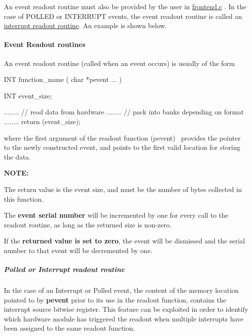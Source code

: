 An event readout routine must also be provided by the user in \hyperlink{frontend_8c}{frontend.c} . In the case of POLLED or INTERRUPT events, the event readout routine is called an \hyperlink{FE_eq_event_routines_FE_poll_or_interrupt_readout_routine}{interrupt readout routine}. An example is shown below.

\par


\par
\hypertarget{FE_eq_event_routines_FE_readout_routine}{}\paragraph{Event Readout routines}\label{FE_eq_event_routines_FE_readout_routine}
An event readout routine (called when an event occurs) is usually of the form 
\begin{DoxyCode}
INT function_name ( char *pevent ... )
{
   INT event_size;

   ........  // read data from hardware
   ........  // pack into banks depending on format
   ........
   return (event_size);
}
\end{DoxyCode}
 where the first argument of the readout function (pevent)~ provides the pointer to the newly constructed event, and points to the first valid location for storing the data. \par
 {\bfseries NOTE:} 
\begin{DoxyItemize}
\item The return value is the event size, and must be the number of bytes collected in this function.  
\item The {\bfseries event serial number} will be incremented by one for every call to the readout routine, as long as the returned size is non-\/zero.  
\item If the {\bfseries returned value is set to zero}, the event will be dismissed and the serial number to that event will be decremented by one.  
\end{DoxyItemize}\par


\par
 \hypertarget{FE_eq_event_routines_FE_poll_or_interrupt_readout_routine}{}\subparagraph{Polled or Interrupt readout routine}\label{FE_eq_event_routines_FE_poll_or_interrupt_readout_routine}
In the case of an Interrupt or Polled event, the content of the memory location pointed to by {\bfseries pevent} prior to its use in the readout function, contains the interrupt source bitwise register. This feature can be exploited in order to identify which hardware module has triggered the readout when multiple interrupts have been assigned to the same readout function.

